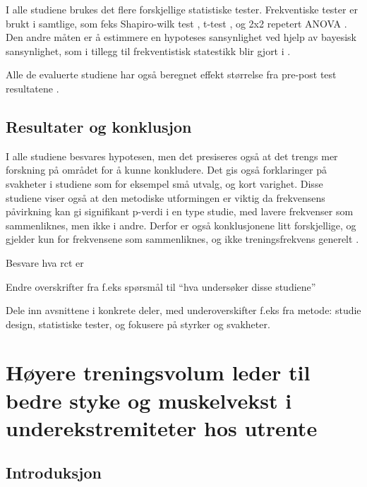 \documentclass[
]{book}
\begin{document}
I alle studiene brukes det flere forskjellige statistiske tester. Frekventiske tester er brukt i samtlige, som feks Shapiro-wilk test \citep{brigatto2019, johnsen2021, lasevicius2019}, t-test \citet{brigatto2019}, og 2x2 repetert ANOVA \citep{brigatto2019, johnsen2021} . Den andre måten er å estimmere en hypoteses sansynlighet ved hjelp av bayesisk sansynlighet, som i tillegg til frekventistisk statestikk blir gjort i \citep{saric2019}.

Alle de evaluerte studiene har også beregnet effekt størrelse fra pre-post test resultatene \citep{brigatto2019, gentil2018, johnsen2021, saric2019, lasevicius2019}.

\hypertarget{resultater-og-konklusjon}{%
\section{\texorpdfstring{\textbf{Resultater og konklusjon}}{Resultater og konklusjon}}\label{resultater-og-konklusjon}}

I alle studiene besvares hypotesen, men det presiseres også at det trengs mer forskning på området for å kunne konkludere. Det gis også forklaringer på svakheter i studiene som for eksempel små utvalg, og kort varighet. Disse studiene viser også at den metodiske utformingen er viktig da frekvensens påvirkning kan gi signifikant p-verdi i en type studie, med lavere frekvenser som sammenliknes, men ikke i andre. Derfor er også konklusjonene litt forskjellige, og gjelder kun for frekvensene som sammenliknes, og ikke treningsfrekvens generelt \citep{johnsen2021, brigatto2019, gentil2018, saric2019, lasevicius2019}.

Besvare hva rct er

Endre overskrifter fra f.eks spørsmål til ``hva undersøker disse studiene''

Dele inn avsnittene i konkrete deler, med underoverskifter f.eks fra metode: studie design, statistiske tester, og fokusere på styrker og svakheter.

\hypertarget{huxf8yere-treningsvolum-leder-til-bedre-styke-og-muskelvekst-i-underekstremiteter-hos-utrente}{%
\chapter{Høyere treningsvolum leder til bedre styke og muskelvekst i underekstremiteter hos utrente}\label{huxf8yere-treningsvolum-leder-til-bedre-styke-og-muskelvekst-i-underekstremiteter-hos-utrente}}

\hypertarget{introduksjon-2}{%
\section{Introduksjon}\label{introduksjon-2}}
\end{document}
